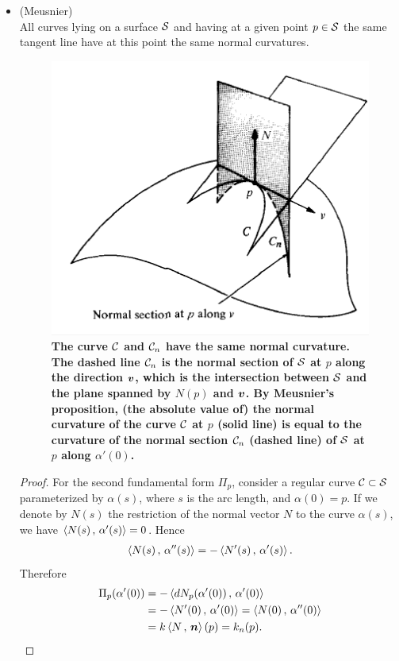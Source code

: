 \documentclass[11pt]{article}
\begin{document}
\begin{itemize}
\item \begin{theorem}(Meusnier) \label{th: meusnier}\\
All curves lying on a surface ${\mathcal S}$ and having at a given point $p\in {\mathcal S}$ the same tangent line have at this point the same normal curvatures. 
\end{theorem}
\begin{figure}[thb]
\centering
\begin{minipage}{0.6\linewidth}
 \centerline{\includegraphics[scale = 0.43]{meusnier.png}}
\end{minipage}
\caption{\scriptsize
\textbf{The curve ${\mathcal C}$ and ${\mathcal C}_{n}$ have the same normal curvature. The dashed line ${\mathcal C}_{n}$ is the normal section of ${\mathcal S}$ at $p$ along the direction $\boldsymbol{v}$, which is the intersection between ${\mathcal S}$ and the plane spanned by $N(p)$ and $\boldsymbol{v}$. By Meusnier's proposition, (the absolute value of) the normal curvature of the curve ${\mathcal C}$ at $p$ (solid line) is equal to the  curvature of the normal section ${\mathcal C}_{n}$ (dashed line) of ${\mathcal S}$ at $p$ along $\alpha'(0)$. }}
\end{figure}
\begin{proof}
For the second fundamental form $\Pi_{p}$, consider a regular curve ${\mathcal C} \subset {\mathcal S}$ parameterized by $\alpha(s)$, where $s$ is the arc length, and $\alpha(0) = p$. If we denote by $N(s)$ the restriction of the normal vector $N$ to the curve $\alpha(s)$, we have $\left\langle N(s)\,,\, \alpha'(s) \right\rangle = 0$. Hence 
\begin{align*}
\left\langle N(s)\,,\, \alpha''(s) \right\rangle = - \left\langle N'(s)\,,\, \alpha'(s) \right\rangle.
\end{align*}
Therefore
\begin{align*}
\Pi_{p}(\alpha'(0)) &= -\left\langle dN_{p}(\alpha'(0))\,,\, \alpha'(0) \right\rangle\\
&= -\left\langle N'(0)\,,\, \alpha'(0) \right\rangle = \left\langle N(0)\,,\, \alpha''(0) \right\rangle\\
&= k\left\langle N\,,\, \boldsymbol{n} \right\rangle(p) = k_{n}(p). 
\end{align*}


\end{proof}
\end{itemize}
\end{document}
